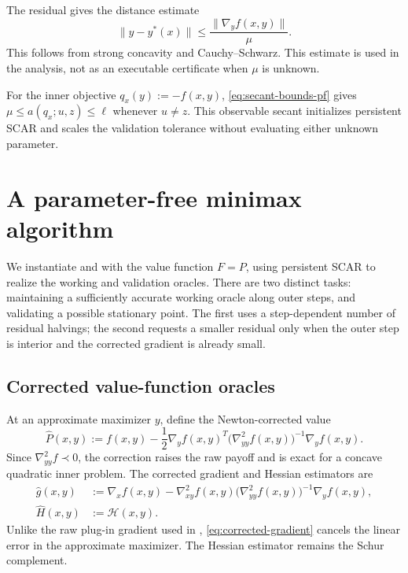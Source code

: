 \documentclass{article}
\begin{document}
The residual gives the distance estimate
\begin{equation}\label{eq:inner-residual-certificate}
 \|y-y^*(x)\|
 \le\frac{\|\nabla_yf(x,y)\|}{\mu}.
\end{equation}
This follows from strong concavity and Cauchy--Schwarz.
This estimate is used in the analysis, not as an executable
certificate when $\mu$ is unknown.

For the inner objective $q_x(y):=-f(x,y)$,
\eqref{eq:secant-bounds-pf} gives
$\mu\le a(q_x;u,z)\le\ell$ whenever $u\ne z$.
This observable secant initializes persistent SCAR and scales the
validation tolerance without evaluating either unknown parameter.


\section{A parameter-free minimax algorithm}
\label{sec:pf-gradient-scaled}

We instantiate  and
 with the value function $F=P$,
using persistent SCAR to realize the working and validation oracles.  There
are two distinct tasks: maintaining a sufficiently accurate working
oracle along outer steps, and validating a possible stationary point.
The first uses a step-dependent number of residual halvings; the
second requests a smaller residual only when the outer step is
interior and the corrected gradient is already small.

\subsection{Corrected value-function oracles}

At an approximate maximizer $y$, define the Newton-corrected value
\begin{equation}\label{eq:corrected-value-pf}
 \widehat P(x,y):=f(x,y)
 -\frac12\nabla_y f(x,y)^T
  \bigl(\nabla^2_{yy}f(x,y)\bigr)^{-1}
  \nabla_y f(x,y).
\end{equation}
Since $\nabla^2_{yy}f\prec0$, the correction raises the raw payoff
and is exact for a concave quadratic inner problem.  The corrected
gradient and Hessian estimators are
\begin{subequations}\label{eq:corrected-derivatives}
\begin{align}
  \widehat g(x,y)
  &:=\nabla_xf(x,y)-\nabla^2_{xy}f(x,y)
       \bigl(\nabla^2_{yy}f(x,y)\bigr)^{-1}\nabla_yf(x,y),
       \label{eq:corrected-gradient}\\
  \widehat H(x,y)
  &:=\mathcal H(x,y).
       \label{eq:corrected-hessian}
\end{align}
\end{subequations}
Unlike the raw plug-in gradient used in
\citet[Algorithm~2]{luo2022finding}, \eqref{eq:corrected-gradient}
cancels the linear error in the approximate maximizer.  The Hessian
estimator remains the Schur complement.
\end{document}
